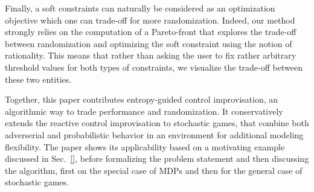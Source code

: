 Finally, a soft constraints can naturally be considered as an optimization objective which one can trade-off for more randomization. Indeed, our method strongly relies on the computation of a Pareto-front that explores the trade-off between randomization and optimizing the soft constraint using the notion of rationality. This means that rather than asking the user to  fix rather arbitrary threshold values for both types of constraints, we visualize the trade-off between these two entities.  

Together, this paper contributes entropy-guided control improvisation, an algorithmic way to trade performance and randomization. 
It conservatively extends the reactive control improvisation to stochastic games, that combine both adverserial and probabilistic behavior in an environment for additional modeling flexibility. 
The paper shows its applicability based on a motivating example discussed in Sec.~\ref{}, before formalizing the problem statement and then discussing the algorithm, first on the special case of MDPs and then for the general case of stochastic games. 


